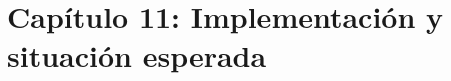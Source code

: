 
\newpage
\section{Capítulo 11: Implementación y situación esperada}\label{cap:implantacion_situacion}




